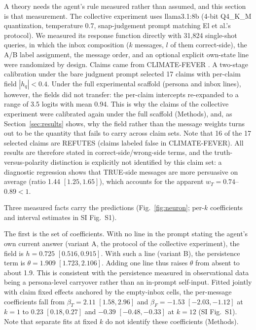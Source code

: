 \documentclass[11pt]{article}
\begin{document}
A theory needs the agent's rule measured rather than assumed, and this
section is that measurement. The collective experiment uses llama3.1:8b
(4-bit Q4\_K\_M quantization, temperature 0.7, snap-judgement prompt
matching El et al.'s protocol). We measured its response function directly
with 31{,}824 single-shot queries, in which the inbox composition ($k$
messages, $l$ of them correct-side), the A/B label assignment, the message
order, and an optional explicit own-state line were randomized by design.
Claims came from CLIMATE-FEVER \citep{Diggelmann2020}. A two-stage
calibration under the bare judgment prompt selected 17 claims with
per-claim field $|h_q| < 0.4$. Under the full experimental scaffold
(persona and inbox lines), however, the fields did not transfer: the
per-claim intercepts re-expanded to a range of 3.5 logits with mean 0.94.
This is why the claims of the collective experiment were calibrated again
under the full scaffold (Methods), and, as Section~\ref{sec:results} shows,
why the field rather than the message weights turns out to be the quantity
that fails to carry across claim sets. Note that 16 of the 17 selected
claims are REFUTES (claims labeled false in CLIMATE-FEVER). All results are
therefore stated in correct-side/wrong-side terms, and the
truth-versus-polarity distinction is explicitly not identified by this
claim set: a diagnostic regression shows that TRUE-side messages are more
persuasive on average (ratio 1.44 $[1.25, 1.65]$), which accounts for the
apparent $w_T = 0.74$--$0.89 < 1$.

Three measured facts carry the predictions (Fig.~\ref{fig:neuron}; per-$k$
coefficients and interval estimates in SI Fig.~S1).

The first is the set of coefficients. With no line in the prompt stating
the agent's own current answer (variant A, the protocol of the collective
experiment), the field is $h = 0.725$ $[0.516, 0.915]$. With such a line
(variant B), the persistence term is $\theta = 1.909$ $[1.723, 2.106]$.
Adding one line thus raises $\theta$ from absent to about 1.9. This is
consistent with the persistence measured in observational data being a
persona-level carryover rather than an in-prompt self-input. Fitted jointly
with claim fixed effects anchored by the empty-inbox cells, the per-message
coefficients fall from $\beta_T = 2.11$ $[1.58, 2.96]$ and
$\beta_F = -1.53$ $[-2.03, -1.12]$ at $k = 1$ to $0.23$ $[0.18, 0.27]$ and
$-0.39$ $[-0.48, -0.33]$ at $k = 12$ (SI Fig.~S1). Note that separate fits
at fixed $k$ do not identify these coefficients (Methods).
\end{document}

